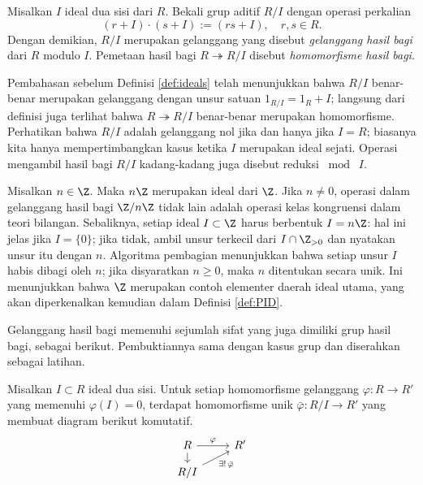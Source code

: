 \begin{definition}
	Misalkan $I$ ideal dua sisi dari $R$. Bekali grup aditif $R/I$ dengan operasi perkalian
	\[ (r+I) \cdot (s+I) := (rs + I), \quad r, s \in R. \]
	Dengan demikian, $R/I$ merupakan gelanggang yang disebut \emph{gelanggang hasil bagi} dari $R$ modulo $I$. Pemetaan hasil bagi $R \twoheadrightarrow R/I$ disebut \emph{homomorfisme hasil bagi}.
\end{definition}
Pembahasan sebelum Definisi \ref{def:ideals} telah menunjukkan bahwa $R/I$ benar-benar merupakan gelanggang dengan unsur satuan $1_{R/I} = 1_R + I$; langsung dari definisi juga terlihat bahwa $R \twoheadrightarrow R/I$ benar-benar merupakan homomorfisme. Perhatikan bahwa $R/I$ adalah gelanggang nol jika dan hanya jika $I=R$; biasanya kita hanya mempertimbangkan kasus ketika $I$ merupakan ideal sejati. Operasi mengambil hasil bagi $R/I$ kadang-kadang juga disebut reduksi $\bmod \;I$.

\begin{example}\label{eg:Z-pid}
	Misalkan $n \in \Z$. Maka $n\Z$ merupakan ideal dari $\Z$. Jika $n \neq 0$, operasi dalam gelanggang hasil bagi $\Z/n\Z$ tidak lain adalah operasi kelas kongruensi dalam teori bilangan. Sebaliknya, setiap ideal $I \subset \Z$ harus berbentuk $I=n\Z$: hal ini jelas jika $I=\{0\}$; jika tidak, ambil unsur terkecil dari $I \cap \Z_{> 0}$ dan nyatakan unsur itu dengan $n$. Algoritma pembagian menunjukkan bahwa setiap unsur $I$ habis dibagi oleh $n$; jika disyaratkan $n \geq 0$, maka $n$ ditentukan secara unik. Ini menunjukkan bahwa $\Z$ merupakan contoh elementer daerah ideal utama, yang akan diperkenalkan kemudian dalam Definisi \ref{def:PID}.
\end{example}

Gelanggang hasil bagi memenuhi sejumlah sifat yang juga dimiliki grup hasil bagi, sebagai berikut. Pembuktiannya sama dengan kasus grup dan diserahkan sebagai latihan.
\begin{proposition}\label{prop:quotient-ring-univ-prop}
	Misalkan $I \subset R$ ideal dua sisi. Untuk setiap homomorfisme gelanggang $\varphi: R \to R'$ yang memenuhi $\varphi(I)=0$, terdapat homomorfisme unik $\bar{\varphi}: R/I \to R'$ yang membuat diagram berikut komutatif.
	\[ \begin{tikzcd}[row sep=small]
		R \arrow[r, "\varphi"] \arrow[d] & R' \\
		R/I \arrow[ur, "{\exists! \,\bar{\varphi}}"'] &
	\end{tikzcd} \]
\end{proposition}

